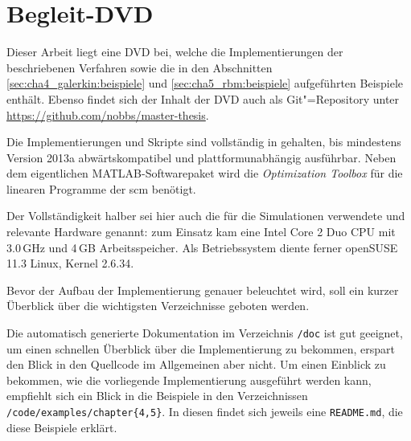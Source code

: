 \documentclass[../main.tex]{subfiles}
\begin{document}
\chapter{Begleit-DVD} %
\label{cha:inhalt_der_begleit_dvd}

Dieser Arbeit liegt eine DVD bei, welche die Implementierungen der beschriebenen Verfahren sowie die in den Abschnitten \ref{sec:cha4_galerkin:beispiele} und \ref{sec:cha5_rbm:beispiele} aufgeführten Beispiele enthält.
Ebenso findet sich der Inhalt der DVD auch als Git"=Repository unter \url{https://github.com/nobbs/master-thesis}.

Die Implementierungen und Skripte sind vollständig in \textcite{Matlab} gehalten, bis mindestens Version 2013a abwärtskompatibel und plattformunabhängig ausführbar.
Neben dem eigentlichen MATLAB-Softwarepaket wird die \emph{Optimization Toolbox} für die linearen Programme der \acl{scm} benötigt.

Der Vollständigkeit halber sei hier auch die für die Simulationen verwendete und relevante Hardware genannt:
zum Einsatz kam eine Intel Core 2 Duo CPU mit 3.0\,GHz und 4\,GB Arbeitsspeicher.
Als Betriebssystem diente ferner openSUSE 11.3 Linux, Kernel 2.6.34.

Bevor der Aufbau der Implementierung genauer beleuchtet wird, soll ein kurzer Überblick über die wichtigsten Verzeichnisse geboten werden.

\bigbreak
{}
\bigbreak

Die automatisch generierte Dokumentation im Verzeichnis \verb!/doc! ist gut geeignet, um einen schnellen Überblick über die Implementierung zu bekommen, erspart den Blick in den Quellcode im Allgemeinen aber nicht.
Um einen Einblick zu bekommen, wie die vorliegende Implementierung ausgeführt werden kann, empfiehlt sich ein Blick in die Beispiele in den Verzeichnissen \verb!/code/examples/chapter{4,5}!.
In diesen findet sich jeweils eine \verb!README.md!, die diese Beispiele erklärt.
\end{document}
